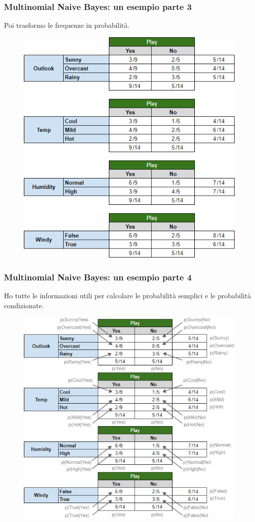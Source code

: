 \begin{frame}
	
	\frametitle{Multinomial Naive Bayes:  un esempio parte 3}
	
	Poi trasformo le frequenze in probabilità.
	
	\begin{figure}[!htbp]
		\centering
		\includegraphics[width=0.5\linewidth]{images/supervised/naive_bayes/naive-bayes-esempio-3.png}
	\end{figure}
	

\end{frame}


\begin{frame}
	
	\frametitle{Multinomial Naive Bayes:  un esempio parte 4}	
	
	Ho tutte le informazioni utili per calcolare le probabilità semplici e le probabilità condizionate.
	
	\begin{figure}[!htbp]
		\centering
		\includegraphics[width=0.5\linewidth]{images/supervised/naive_bayes/naive-bayes-esempio-4.png}
	\end{figure}
	

\end{frame}


